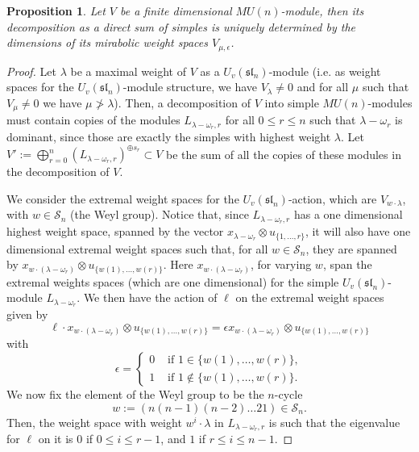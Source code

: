 \documentclass{amsart}
\numberwithin{equation}{section}
\theoremstyle{theorem}
\newtheorem{proposition}[theorem]{Proposition}
\theoremstyle{definition}
\newcommand{\sll}{\mathfrak{sl}}
\newcommand{\uvsln}{U_v(\sll_n)}
\begin{document}
\begin{proposition} \label{prop:weightspace}
Let $V$ be a finite dimensional $MU(n)$-module, then its decomposition as a direct sum of simples is uniquely determined by the dimensions of its mirabolic weight spaces $V_{\mu,\epsilon}$. %
\end{proposition}
\begin{proof}
Let $\lambda$ be a maximal weight of $V$ as a $U_v(\sll_n)$-module (i.e. as weight spaces for the $U_v(\sll_n)$-module structure, we have $V_\lambda\neq 0$ and for all $\mu$ such that $V_\mu\neq 0$ we have $\mu\not >\lambda$). Then, a decomposition of $V$ into simple $MU(n)$-modules must contain copies of the modules $L_{\lambda-\omega_r,r}$ for all $0\leq r\leq n$ such that $\lambda-\omega_r$ is dominant, since those are exactly the simples with highest weight $\lambda$.
Let $V':=\bigoplus_{r=0}^n (L_{\lambda-\omega_r,r})^{\oplus s_r}\subset V$ be the sum of all the copies of these modules in the decomposition of $V$.

We consider the extremal weight spaces for the $U_v(\sll_n)$-action, which are $V_{w\cdot\lambda}$, with $w\in \mathcal{S}_n$ (the Weyl group). Notice that, since $L_{\lambda-\omega_r,r}$ has a one dimensional highest weight space, spanned by the vector $x_{\lambda-\omega_r}\otimes u_{\{1,\ldots,r\}}$, it will also have one dimensional extremal weight spaces such that, for all $w\in \mathcal{S}_n$, they are spanned by $x_{w\cdot(\lambda-\omega_r)}\otimes u_{\{w(1),\ldots,w(r)\}}$. Here $x_{w\cdot(\lambda-\omega_r)}$, for varying $w$, span the extremal weights spaces (which are one dimensional) for the simple $\uvsln$-module $L_{\lambda-\omega_r}$. We then have the action of $\ell$ on the extremal weight spaces given by 
$$\ell\cdot x_{w\cdot(\lambda-\omega_r)}\otimes u_{\{w(1),\ldots,w(r)\}}=\epsilon x_{w\cdot(\lambda-\omega_r)}\otimes u_{\{w(1),\ldots,w(r)\}}$$
with
$$\epsilon=\begin{cases}0 & \text{ if }1\in\{w(1),\ldots,w(r)\},\\ 1 & \text{ if }1\not\in\{w(1),\ldots,w(r)\}.\end{cases}$$ 
We now fix the element of the Weyl group to be the $n$-cycle 
$$w:=(n (n-1) (n-2) \ldots 2 1)\in \mathcal{S}_n.$$ Then, the weight space with weight $w^i\cdot \lambda$ in $L_{\lambda-\omega_r,r}$ is such that the eigenvalue for $\ell$ on it is $0$ if $0\leq i\leq r-1$, and $1$ if $r\leq i\leq n-1$. 


\end{proof}
\end{document}
